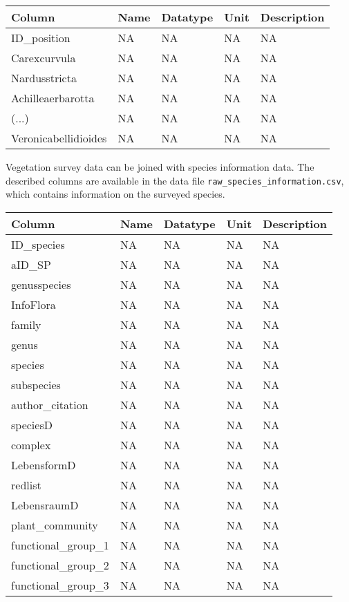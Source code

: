 \documentclass[
]{book}
\begin{document}
\begin{tabular}{lllll}
\toprule
Column & Name & Datatype & Unit & Description\\
\midrule
ID\_position & NA & NA & NA & NA\\
Carexcurvula & NA & NA & NA & NA\\
Nardusstricta & NA & NA & NA & NA\\
Achilleaerbarotta & NA & NA & NA & NA\\
(...) & NA & NA & NA & NA\\
\addlinespace
Veronicabellidioides & NA & NA & NA & NA\\
\bottomrule
\end{tabular}

Vegetation survey data can be joined with species information data. The described columns are available in the data file \texttt{raw\_species\_information.csv}, which contains information on the surveyed species.

\begin{tabular}{lllll}
\toprule
Column & Name & Datatype & Unit & Description\\
\midrule
ID\_species & NA & NA & NA & NA\\
aID\_SP & NA & NA & NA & NA\\
genusspecies & NA & NA & NA & NA\\
InfoFlora & NA & NA & NA & NA\\
family & NA & NA & NA & NA\\
\addlinespace
genus & NA & NA & NA & NA\\
species & NA & NA & NA & NA\\
subspecies & NA & NA & NA & NA\\
author\_citation & NA & NA & NA & NA\\
speciesD & NA & NA & NA & NA\\
\addlinespace
complex & NA & NA & NA & NA\\
LebensformD & NA & NA & NA & NA\\
redlist & NA & NA & NA & NA\\
LebensraumD & NA & NA & NA & NA\\
plant\_community & NA & NA & NA & NA\\
\addlinespace
functional\_group\_1 & NA & NA & NA & NA\\
functional\_group\_2 & NA & NA & NA & NA\\
functional\_group\_3 & NA & NA & NA & NA\\
\bottomrule
\end{tabular}
\end{document}

